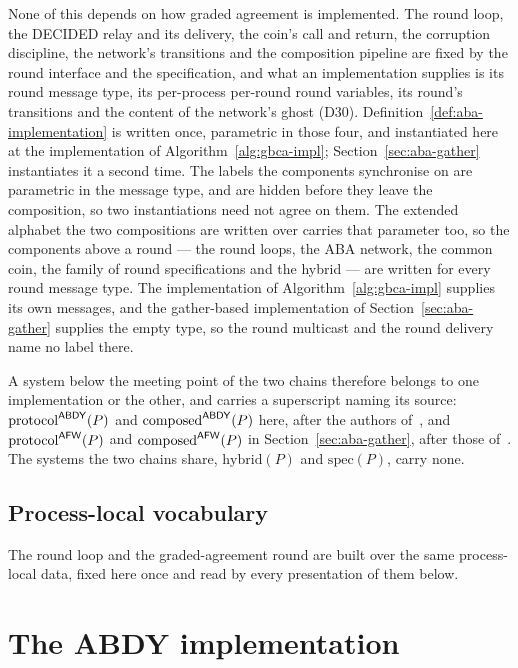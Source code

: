 None of this depends on how graded agreement is implemented.
The round loop, the DECIDED relay and its delivery, the coin's call and return, the
corruption discipline, the network's transitions and the composition pipeline are
fixed by the round interface and the specification, and what an implementation
supplies is its round message type, its per-process per-round round variables, its
round's transitions and the content of the network's ghost (D30).
Definition~\ref{def:aba-implementation} is written once, parametric in those four, and
instantiated here at the implementation of Algorithm~\ref{alg:gbca-impl};
Section~\ref{sec:aba-gather} instantiates it a second time.
The labels the components synchronise on are parametric in the message type, and are
hidden before they leave the composition, so two instantiations need not agree
on them.
The extended alphabet the two compositions are written over carries that
parameter too, so the components above a round --- the round loops, the ABA
network, the common coin, the family of round specifications and the hybrid ---
are written for every round message type.
The implementation of Algorithm~\ref{alg:gbca-impl} supplies its own messages,
and the gather-based implementation of Section~\ref{sec:aba-gather} supplies
the empty type, so the round multicast and the round delivery name no label
there.

A system below the meeting point of the two chains therefore belongs to one
implementation or the other, and carries a superscript naming its source:
$\mathrm{protocol}^{\mathsf{ABDY}}(P)$ and $\mathrm{composed}^{\mathsf{ABDY}}(P)$ here, after the
authors of~\cite{ABDY22}, and $\mathrm{protocol}^{\mathsf{AFW}}(P)$ and
$\mathrm{composed}^{\mathsf{AFW}}(P)$ in Section~\ref{sec:aba-gather}, after those
of~\cite{AFW25}.
The systems the two chains share, $\mathrm{hybrid}(P)$ and $\mathrm{spec}(P)$,
carry none.


\subsection{Process-local vocabulary}

The round loop and the graded-agreement round are built over the same
process-local data, fixed here once and read by every presentation of them
below.






\section{The ABDY implementation}
\label{sec:aba-abdy}

